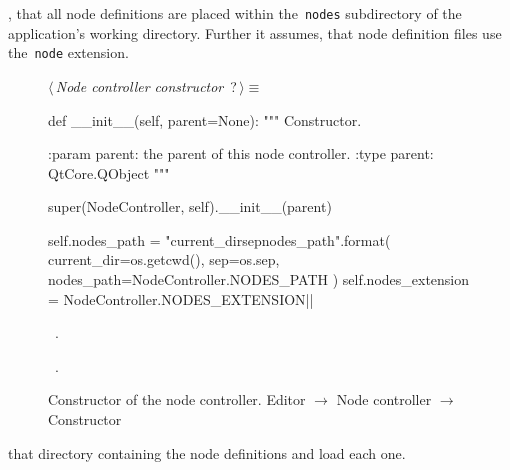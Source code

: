 \documentclass[%
    a4paper,    %
    justified,  %
    nobib,      %
    openany     %
]{tufte-book}
\begin{document}
, that all node definitions are placed
within the~\verb=nodes= subdirectory of the application's working directory.
Further it assumes, that node definition files use the~\verb=node= extension.

\begin{figure}
\begin{flushleft} \small
\begin{minipage}{\linewidth}\label{scrap107}\raggedright\small
{} $\langle\,${\itshape Node controller constructor}\nobreak\ {\footnotesize {?}}$\,\rangle\equiv$
\vspace{-1ex}
\begin{pythoncode}
def __init__(self, parent=None):
    """ Constructor. 

    :param parent: the parent of this node controller.
    :type  parent: QtCore.QObject
    """

    super(NodeController, self).__init__(parent)

    self.nodes_path = "{current_dir}{sep}{nodes_path}".format(
        current_dir=os.getcwd(),
        sep=os.sep,
        nodes_path=NodeController.NODES_PATH
    )
    self.nodes_extension = NodeController.NODES_EXTENSION|\NWsep|
\end{pythoncode}
\vspace{1.5ex}
\footnotesize
\begin{list}{}{\setlength{\itemsep}{-\parsep}\setlength{\itemindent}{-\leftmargin}}
\item \NWtxtMacroDefBy\ .
\item \NWtxtMacroRefIn\ .

\item{}
\end{list}
\end{minipage}\vspace{4ex}
\end{flushleft}
\caption{Constructor of the node controller.
  \newline{}\newline{}Editor $\rightarrow$ Node controller $\rightarrow$
  Constructor}
\label{editor:lst:node-controller:constructor}
\end{figure}

 that directory containing the
node definitions and load each one.
\end{document}

